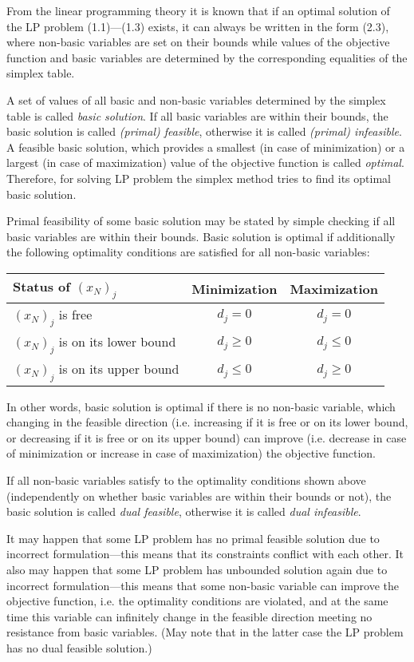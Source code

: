 From the linear programming theory it is known that if an optimal
solution of the LP problem (1.1)---(1.3) exists, it can always be
written in the form (2.3), where non-basic variables are set on their
bounds while values of the objective function and basic variables are
determined by the corresponding equalities of the simplex table.

A set of values of all basic and non-basic variables determined by the
simplex table is called {\it basic solution}. If all basic variables are
within their bounds, the basic solution is called {\it (primal)
feasible}, otherwise it is called {\it (primal) infeasible}. A feasible
basic solution, which provides a smallest (in case of minimization) or
a largest (in case of maximization) value of the objective function is
called {\it optimal}. Therefore, for solving LP problem the simplex
method tries to find its optimal basic solution.

Primal feasibility of some basic solution may be stated by simple
checking if all basic variables are within their bounds. Basic solution
is optimal if additionally the following optimality conditions are
satisfied for all non-basic variables:
\begin{center}
\begin{tabular}{lcc}
Status of $(x_N)_j$ & Minimization & Maximization \\
\hline
$(x_N)_j$ is free & $d_j = 0$ & $d_j = 0$ \\
$(x_N)_j$ is on its lower bound & $d_j \geq 0$ & $d_j \leq 0$ \\
$(x_N)_j$ is on its upper bound & $d_j \leq 0$ & $d_j \geq 0$ \\
\end{tabular}
\end{center}
In other words, basic solution is optimal if there is no non-basic
variable, which changing in the feasible direction (i.e. increasing if
it is free or on its lower bound, or decreasing if it is free or on its
upper bound) can improve (i.e. decrease in case of minimization or
increase in case of maximization) the objective function.

If all non-basic variables satisfy to the optimality conditions shown
above (independently on whether basic variables are within their bounds
or not), the basic solution is called {\it dual feasible}, otherwise it
is called {\it dual infeasible}.

It may happen that some LP problem has no primal feasible solution due
to incorrect formulation---this means that its constraints conflict
with each other. It also may happen that some LP problem has unbounded
solution again due to incorrect formulation---this means that some
non-basic variable can improve the objective function, i.e. the
optimality conditions are violated, and at the same time this variable
can infinitely change in the feasible direction meeting no resistance
from basic variables. (May note that in the latter case the LP problem
has no dual feasible solution.)

